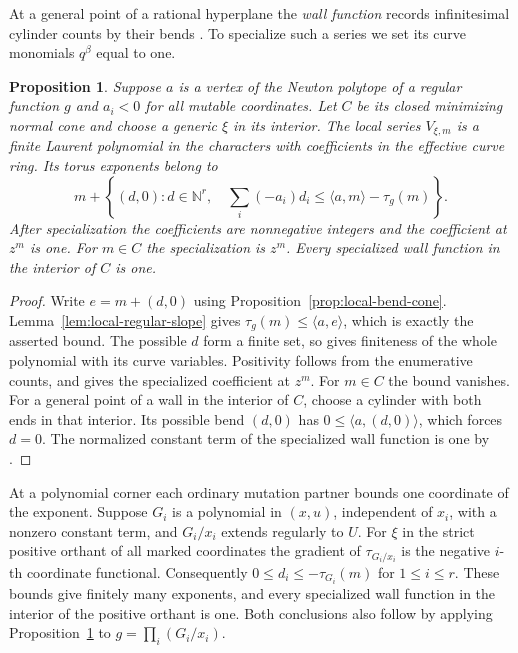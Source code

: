 \documentclass[11pt,reqno]{amsart}
\numberwithin{equation}{section}
\newtheorem{proposition}[theorem]{Proposition}
\theoremstyle{definition}
\theoremstyle{remark}
\begin{document}
At a general point of a rational hyperplane the \emph{wall function}
records infinitesimal cylinder counts by their bends
\cite[Proposition~20.13 and Definition~20.32]{KY}. To specialize
such a series we set its curve monomials \(q^\beta\) equal to one.

\begin{proposition}\label{prop:local-support}
Suppose \(a\) is a vertex of the Newton polytope of a regular function
\(g\) and \(a_i<0\) for all mutable coordinates. Let \(C\) be its
closed minimizing normal cone and choose a generic \(\xi\) in its
interior. The local series \(V_{\xi,m}\) is a finite Laurent polynomial in the characters with coefficients in the
effective curve ring. Its torus exponents
belong to
\[ m+\left\{(d,0):d\in\mathbb N^r,\quad \sum_i(-a_i)d_i\leq\langle a,m\rangle-\tau_g(m)\right\}. \]
After specialization the coefficients are nonnegative integers and
the coefficient at \(z^m\) is one. For \(m\in C\) the specialization
is \(z^m\). Every specialized wall function in the interior of \(C\)
is one.
\end{proposition}
\begin{proof}
Write \(e=m+(d,0)\) using Proposition~\ref{prop:local-bend-cone}.
Lemma~\ref{lem:local-regular-slope} gives
\(\tau_g(m)\leq\langle a,e\rangle\), which is exactly the asserted
bound. The possible \(d\) form a finite set, so
\cite[Lemma~20.31]{KY} gives finiteness of the whole polynomial with
its curve variables. Positivity follows from the enumerative counts,
and \cite[Lemma~20.34]{KY} gives the specialized coefficient at
\(z^m\). For \(m\in C\) the bound vanishes. For a general point of a wall in the interior of \(C\), choose a
cylinder with both ends in that interior. Its possible bend \((d,0)\) has
\(0\leq\langle a,(d,0)\rangle\), which forces \(d=0\). The
normalized constant term of the specialized wall function is one
by \cite[Proposition~20.33]{KY}.
\end{proof}

At a polynomial corner each ordinary mutation partner bounds one coordinate of the exponent.
Suppose \(G_i\) is a polynomial in \((x,u)\), independent of
\(x_i\), with a nonzero constant term, and \(G_i/x_i\) extends
regularly to \(U\). For \(\xi\) in the strict positive orthant of
all marked coordinates the gradient of \(\tau_{G_i/x_i}\) is the
negative \(i\)-th coordinate functional. Consequently \(0\le d_i\le-\tau_{G_i}(m)\) for \(1\le i\le r\).
These bounds give finitely many exponents, and every specialized wall
function in the interior of the positive orthant is one. Both conclusions
also follow by applying Proposition~\ref{prop:local-support} to
\(g=\prod_i(G_i/x_i)\).
\end{document}
